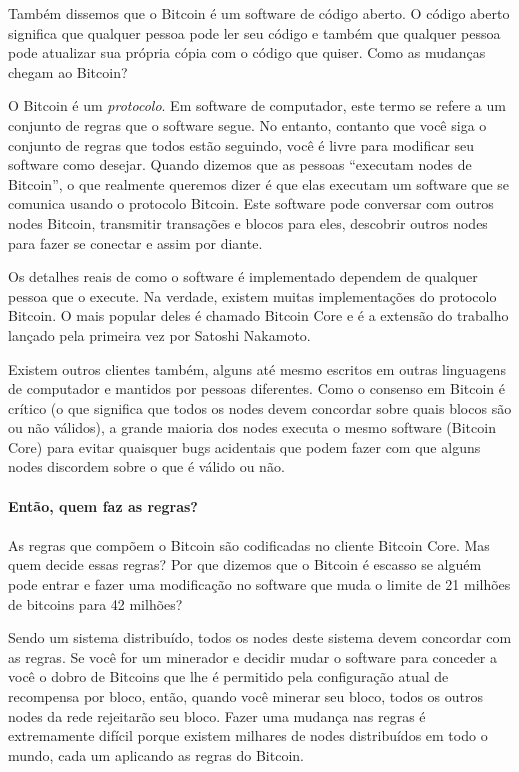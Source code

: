 Também dissemos que o Bitcoin é um software de código aberto. O código aberto significa que qualquer pessoa pode ler seu código e também que qualquer pessoa pode atualizar sua própria cópia com o código que quiser. Como as mudanças chegam ao Bitcoin?

O Bitcoin é um \textit{protocolo}. Em software de computador, este termo se refere a um conjunto de regras que o software segue. No entanto, contanto que você siga o conjunto de regras que todos estão seguindo, você é livre para modificar seu software como desejar. Quando dizemos que as pessoas “executam nodes de Bitcoin”, o que realmente queremos dizer é que elas executam um software que se comunica usando o protocolo Bitcoin. Este software pode conversar com outros nodes Bitcoin, transmitir transações e blocos para eles, descobrir outros nodes para fazer se conectar e assim por diante.

Os detalhes reais de como o software é implementado dependem de qualquer pessoa que o execute. Na verdade, existem muitas implementações do protocolo Bitcoin. O mais popular deles é chamado Bitcoin Core e é a extensão do trabalho lançado pela primeira vez por Satoshi Nakamoto.

Existem outros clientes também, alguns até mesmo escritos em outras linguagens de computador e mantidos por pessoas diferentes. Como o consenso em Bitcoin é crítico (o que significa que todos os nodes devem concordar sobre quais blocos são ou não válidos), a grande maioria dos nodes executa o mesmo software (Bitcoin Core) para evitar quaisquer bugs acidentais que podem fazer com que alguns nodes discordem sobre o que é válido ou não.
\newpage
\paragraph{Então, quem faz as regras?}
\paragraph{}

As regras que compõem o Bitcoin são codificadas no cliente Bitcoin Core. Mas quem decide essas regras? Por que dizemos que o Bitcoin é escasso se alguém pode entrar e fazer uma modificação no software que muda o limite de 21 milhões de bitcoins para 42 milhões?

Sendo um sistema distribuído, todos os nodes deste sistema devem concordar com as regras. Se você for um minerador e decidir mudar o software para conceder a você o dobro de Bitcoins que lhe é permitido pela configuração atual de recompensa por bloco, então, quando você minerar seu bloco, todos os outros nodes da rede rejeitarão seu bloco. Fazer uma mudança nas regras é extremamente difícil porque existem milhares de nodes distribuídos em todo o mundo, cada um aplicando as regras do Bitcoin.

